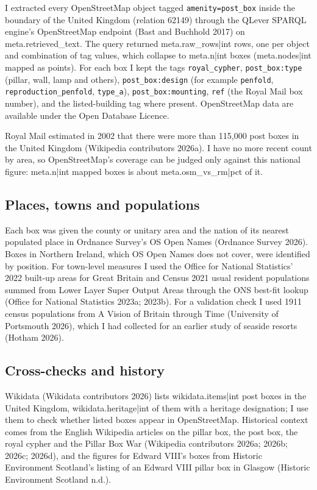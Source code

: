 \documentclass[11pt,a4paper]{article}
\begin{document}
I extracted every OpenStreetMap object tagged \texttt{amenity=post\_box} inside the boundary of the United Kingdom (relation 62149) through the QLever SPARQL engine's OpenStreetMap endpoint (Bast and Buchhold 2017) on {{meta.retrieved_text}}. The query returned {{meta.raw_rows|int}} rows, one per object and combination of tag values, which collapse to {{meta.n|int}} boxes ({{meta.nodes|int}} mapped as points). For each box I kept the tags \texttt{royal\_cypher}, \texttt{post\_box:type} (pillar, wall, lamp and others), \texttt{post\_box:design} (for example \texttt{penfold}, \texttt{reproduction\_penfold}, \texttt{type\_a}), \texttt{post\_box:mounting}, \texttt{ref} (the Royal Mail box number), and the listed-building tag where present. OpenStreetMap data are available under the Open Database Licence.

Royal Mail estimated in 2002 that there were more than 115,000 post boxes in the United Kingdom (Wikipedia contributors 2026a). I have no more recent count by area, so OpenStreetMap's coverage can be judged only against this national figure: {{meta.n|int}} mapped boxes is about {{meta.osm_vs_rm|pct}} of it.

\subsection{Places, towns and populations}

Each box was given the county or unitary area and the nation of its nearest populated place in Ordnance Survey's OS Open Names (Ordnance Survey 2026). Boxes in Northern Ireland, which OS Open Names does not cover, were identified by position. For town-level measures I used the Office for National Statistics' 2022 built-up areas for Great Britain and Census 2021 usual resident populations summed from Lower Layer Super Output Areas through the ONS best-fit lookup (Office for National Statistics 2023a; 2023b). For a validation check I used 1911 census populations from A Vision of Britain through Time (University of Portsmouth 2026), which I had collected for an earlier study of seaside resorts (Hotham 2026).

\subsection{Cross-checks and history}

Wikidata (Wikidata contributors 2026) lists {{wikidata.items|int}} post boxes in the United Kingdom, {{wikidata.heritage|int}} of them with a heritage designation; I use them to check whether listed boxes appear in OpenStreetMap. Historical context comes from the English Wikipedia articles on the pillar box, the post box, the royal cypher and the Pillar Box War (Wikipedia contributors 2026a; 2026b; 2026c; 2026d), and the figures for Edward VIII's boxes from Historic Environment Scotland's listing of an Edward VIII pillar box in Glasgow (Historic Environment Scotland n.d.).
\end{document}
